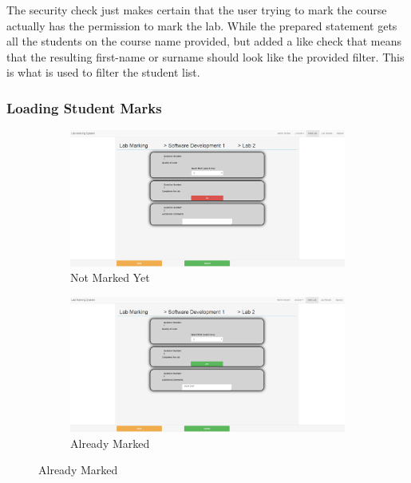 \documentclass[12pt]{article}  %
\begin{document}
\noindent The security check just makes certain that the user trying to mark the course actually has the permission to mark the lab. While the prepared statement gets all the students on the course name provided, but added a like check that means that the resulting first-name or surname should look like the provided filter. This is what is used to filter the student list.



\subsubsection{Loading Student Marks}

\begin{figure}[H]
\caption{Marking Student Page}
\centering
\begin{subfigure}[c]{0.45\textwidth}
    \includegraphics[width=1\textwidth]{images/implementation/marking-5-page.png}
    \caption{Not Marked Yet}
    \label{fig:marking-not}
\end{subfigure}
\hfill
\begin{subfigure}[c]{0.45\textwidth}
    \includegraphics[width=1\textwidth]{images/implementation/marking-6-page.png}
    \caption{Already Marked}
    \label{fig:marking-already}
\end{subfigure}

\end{figure}
\end{document}
